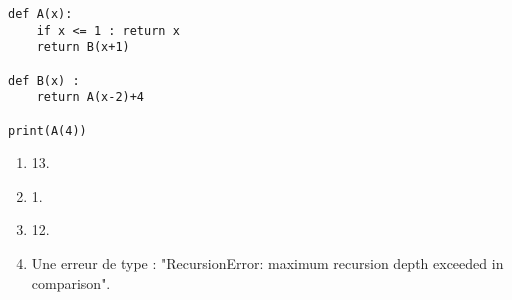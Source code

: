 \begin{lstlisting}
def A(x):
    if x <= 1 : return x
    return B(x+1)

def B(x) :
    return A(x-2)+4

print(A(4))
\end{lstlisting}

\begin{enumerate}
\item 13. %
\item 1.
\item 12.
\item Une erreur de type : "RecursionError: maximum recursion depth exceeded in comparison".
\end{enumerate}
